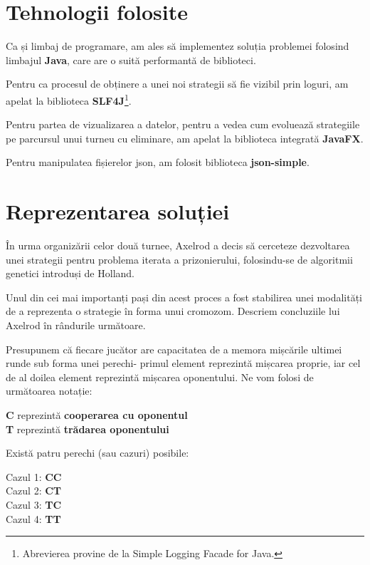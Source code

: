 \section{Tehnologii folosite}

Ca și limbaj de programare, am ales să implementez soluția problemei folosind limbajul \textbf{Java}, care are o suită performantă de biblioteci. 

Pentru ca procesul de obținere a unei noi strategii să fie vizibil prin loguri, am apelat la biblioteca \textbf{SLF4J}\cite{slf4j}\footnote{Abrevierea provine de la Simple Logging Facade for Java.}. 

Pentru partea de vizualizarea a datelor, pentru a vedea cum evoluează strategiile pe parcursul unui turneu cu eliminare, am apelat la biblioteca integrată \textbf{JavaFX}\cite{javaFX}. 

Pentru manipulatea fișierelor json, am folosit biblioteca \textbf{json-simple}\cite{json-simple}.  

\section{Reprezentarea soluției}

În urma organizării celor două turnee, Axelrod a decis să cerceteze dezvoltarea unei strategii pentru problema iterata a prizonierului, folosindu-se de algoritmii genetici introduși de Holland. 

Unul din cei mai importanți pași din acest proces a fost stabilirea unei modalități de a reprezenta o strategie în forma unui cromozom. Descriem concluziile lui Axelrod în rândurile următoare.

Presupunem că fiecare jucător are capacitatea de a memora mișcările ultimei runde sub forma unei perechi- primul element reprezintă mișcarea proprie, iar cel de al doilea element reprezintă mișcarea oponentului. Ne vom folosi de următoarea notație:

\begin{center}
	\textbf{C} reprezintă \textbf{cooperarea cu oponentul}\\
	\textbf{T} reprezintă \textbf{trădarea oponentului}   
\end{center}

Există patru perechi (sau cazuri) posibile:\\

\begin{center}
	Cazul 1: \textbf{CC}\\
	Cazul 2: \textbf{CT}\\
	Cazul 3: \textbf{TC}\\
	Cazul 4: \textbf{TT}\\
\end{center}


